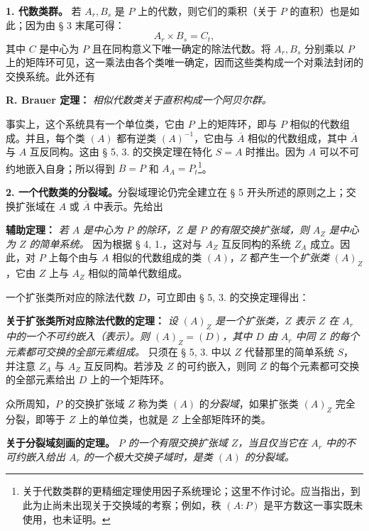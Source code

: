 \documentclass[11pt]{article}
\providecommand{\srcspaced}[1]{#1}
\begin{document}
\noindent\textbf{\srcspaced{1. 代数类群。}} 若 \(A_r,B_s\) 是 \(P\) 上的代数，则它们的乘积（关于 \(P\) 的直积）也是如此；因为由 § 3 末尾可得：
\[
        A_r\times B_s=C_t,
\]
其中 \(C\) 是中心为 \(P\) 且在同构意义下唯一确定的除法代数。将 \(A_r,B_s\) 分别乘以 \(P\) 上的矩阵环可见，这一乘法由各个类唯一确定，因而这些类构成一个对乘法封闭的交换系统。此外还有

\noindent\textbf{\srcspaced{R. Brauer 定理：}} \emph{相似代数类关于直积构成一个阿贝尔群。}

事实上，这个系统具有一个单位类，它由 \(P\) 上的矩阵环，即与 \(P\) 相似的代数组成。并且，每个类 \((A)\) 都有逆类 \((A)^{-1}\)，它由与 \(\overline A\) 相似的代数组成，其中 \(\overline A\) 与 \(A\) 互反同构。这由 § 5, 3. 的交换定理在特化 \(S=A\) 时推出。因为 \(A\) 可以不可约地嵌入自身；所以得到 \(B=P\) 和 \(A_A=P_t\)\footnote{关于代数类群的更精细定理使用因子系统理论；这里不作讨论。应当指出，到此为止尚未出现关于交换域的考察；例如，秩 \((A:P)\) 是平方数这一事实既未使用，也未证明。}。

\noindent\textbf{\srcspaced{2. 一个代数类的分裂域。}}\quad 分裂域理论仍完全建立在 § 5 开头所述的原则之上；交换扩张域在 \(A\) 或 \(\overline A\) 中表示。先给出

\medskip
\noindent\textbf{\srcspaced{辅助定理：}} \emph{若 \(A\) 是中心为 \(P\) 的除环，\(Z\) 是 \(P\) 的有限交换扩张域，则 \(A_Z\) 是中心为 \(Z\) 的简单系统。} 因为根据 § 4, 1.，这对与 \(A_Z\) 互反同构的系统 \(Z_A\) 成立。因此，对 \(P\) 上每个由与 \(A\) 相似的代数组成的类 \((A)\)，\(Z\) 都产生一个\emph{扩张类} \((A)_Z\)，它由 \(Z\) 上与 \(A_Z\) 相似的简单代数组成。

一个扩张类所对应的除法代数 \(D\)，可立即由 § 5, 3. 的交换定理得出：

\noindent\textbf{\srcspaced{关于扩张类所对应除法代数的定理：}} \emph{设 \((A)_Z\) 是一个扩张类，\(Z\) 表示 \(Z\) 在 \(A_r\) 中的一个不可约嵌入（表示）。则 \((A)_Z=(D)\)，其中 \(D\) 由 \(A_r\) 中同 \(Z\) 的每个元素都可交换的全部元素组成。} 只须在 § 5, 3. 中以 \(Z\) 代替那里的简单系统 \(S\)，并注意 \(Z_A\) 与 \(A_Z\) 互反同构。若涉及 \(Z\) 的可约嵌入，则同 \(Z\) 的每个元素都可交换的全部元素给出 \(D\) 上的一个矩阵环。

众所周知，\(P\) 的交换扩张域 \(Z\) 称为类 \((A)\) 的\emph{分裂域}，如果扩张类 \((A)_Z\) 完全分裂，即等于 \(Z\) 上的单位类，也就是 \(Z\) 上全部矩阵环的类。

\noindent\textbf{\srcspaced{关于分裂域刻画的定理。}}
\emph{\(P\) 的一个有限交换扩张域 \(Z\)，当且仅当它在 \(A_r\) 中的不可约嵌入给出 \(A_r\) 的一个极大交换子域时，是类 \((A)\) 的分裂域。}
\end{document}
